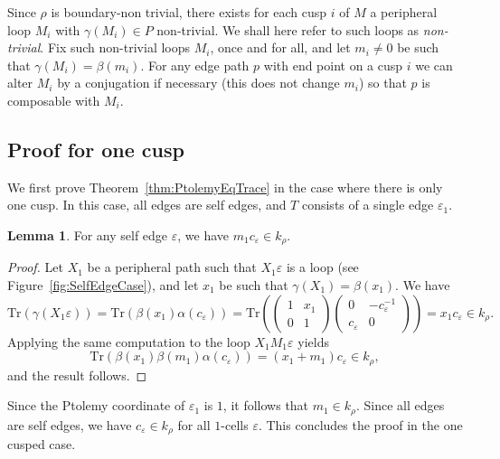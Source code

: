 \documentclass[12pt]{amsart}
\theoremstyle{definition}
\newtheorem{lemma}[theorem]{Lemma}
\numberwithin{equation}{section}
\def\Tr{\mathrm{Tr}}
\begin{document}
Since $\rho$ is boundary-non trivial, there exists for each cusp $i$ of $M$ a peripheral loop $M_i$ with $\gamma(M_i)\in P$ non-trivial. We shall here refer to such loops as \emph{non-trivial}. Fix such non-trivial loops $M_i$, once and for all, and let $m_i\neq 0$ be such that $\gamma(M_i)=\beta(m_i)$.
For any edge path $p$ with end point on a cusp $i$ we can alter $M_i$ by a conjugation if necessary (this does not change $m_i$) so that $p$ is composable with $M_i$.

\subsection{Proof for one cusp}
We first prove Theorem~\ref{thm:PtolemyEqTrace} in the case where there is only one cusp. In this case, all edges are self edges, and $T$ consists of a single edge $\varepsilon_1$.
\begin{lemma}\label{lemma:BootStrapEdgeOneCusp} For any self edge $\varepsilon$, we have $m_1c_\varepsilon\in k_\rho$. 
\end{lemma}
\begin{proof}
Let $X_1$ be a peripheral path such that $X_1\varepsilon$ is a loop (see Figure~\ref{fig:SelfEdgeCase}), and let $x_1$ be such that $\gamma(X_1)=\beta(x_1)$. We have
\begin{equation}\label{eq:OneCuspTraceRel}
\Tr(\gamma(X_1\varepsilon))=\Tr(\beta(x_1)\alpha(c_\varepsilon)) =\Tr\left(\begin{pmatrix}1&x_1\\0&1\end{pmatrix}\begin{pmatrix}0&-c_\varepsilon^{-1}\\c_\varepsilon&0\end{pmatrix}\right)=x_1c_\varepsilon\in k_\rho.
\end{equation}
Applying the same computation to the loop $X_1 M_1 \varepsilon$ yields
\begin{equation}
\Tr(\beta(x_1)\beta(m_1)\alpha(c_\varepsilon))=(x_1+m_1)c_\varepsilon\in k_\rho,
\end{equation}
and the result follows.
\end{proof}
Since the Ptolemy coordinate of $\varepsilon_1$ is $1$, it follows that $m_1\in k_\rho$. Since all edges are self edges, we have $c_\varepsilon\in k_\rho$ for all $1$-cells $\varepsilon$. This concludes the proof in the one cusped case.
\end{document}
